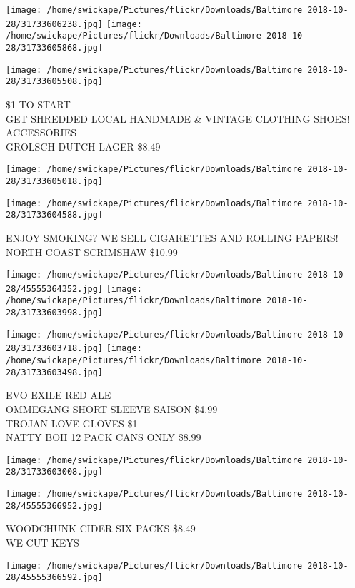 \documentclass[10pt,letterpaper]{article}
\begin{document}
\texttt{[image: /home/swickape/Pictures/flickr/Downloads/Baltimore 2018-10-28/31733606238.jpg]}
\texttt{[image: /home/swickape/Pictures/flickr/Downloads/Baltimore 2018-10-28/31733605868.jpg]}

\texttt{[image: /home/swickape/Pictures/flickr/Downloads/Baltimore 2018-10-28/31733605508.jpg]}

\$1 TO START\\
GET SHREDDED LOCAL HANDMADE \& VINTAGE CLOTHING SHOES! ACCESSORIES\\
GROLSCH DUTCH LAGER \$8.49
\pagebreak

\texttt{[image: /home/swickape/Pictures/flickr/Downloads/Baltimore 2018-10-28/31733605018.jpg]}

\vspace{0.25in}
\texttt{[image: /home/swickape/Pictures/flickr/Downloads/Baltimore 2018-10-28/31733604588.jpg]}

ENJOY SMOKING?  WE SELL CIGARETTES AND ROLLING PAPERS!\\
NORTH COAST SCRIMSHAW \$10.99
\pagebreak

\texttt{[image: /home/swickape/Pictures/flickr/Downloads/Baltimore 2018-10-28/45555364352.jpg]}
\texttt{[image: /home/swickape/Pictures/flickr/Downloads/Baltimore 2018-10-28/31733603998.jpg]}

\texttt{[image: /home/swickape/Pictures/flickr/Downloads/Baltimore 2018-10-28/31733603718.jpg]}
\texttt{[image: /home/swickape/Pictures/flickr/Downloads/Baltimore 2018-10-28/31733603498.jpg]}

EVO EXILE RED ALE\\
OMMEGANG SHORT SLEEVE SAISON \$4.99\\
TROJAN LOVE GLOVES \$1\\
NATTY BOH 12 PACK CANS ONLY \$8.99
\pagebreak

\texttt{[image: /home/swickape/Pictures/flickr/Downloads/Baltimore 2018-10-28/31733603008.jpg]}

\vspace{0.25in}
\texttt{[image: /home/swickape/Pictures/flickr/Downloads/Baltimore 2018-10-28/45555366952.jpg]}

WOODCHUNK CIDER SIX PACKS \$8.49\\
WE CUT KEYS
\pagebreak

\texttt{[image: /home/swickape/Pictures/flickr/Downloads/Baltimore 2018-10-28/45555366592.jpg]}
\end{document}

